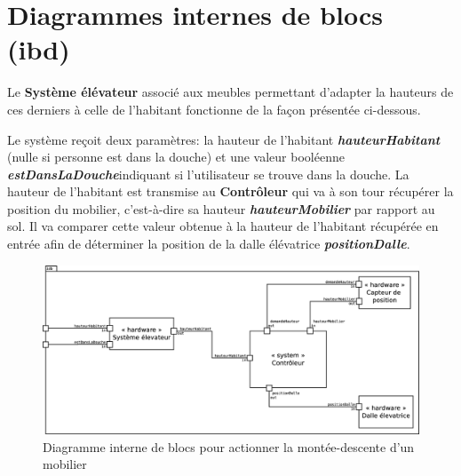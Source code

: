 \chapter{Diagrammes internes de blocs (ibd)}
Le \textbf{Système élévateur} associé aux meubles permettant d'adapter la hauteurs de ces derniers à celle de l'habitant fonctionne de la façon présentée ci-dessous.

Le système reçoit deux paramètres: la hauteur de l'habitant \textbf{\textit{hauteurHabitant}} (nulle si personne est dans la douche) et une valeur booléenne \textbf{\textit{estDansLaDouche}}indiquant si l'utilisateur se trouve dans la douche. 
La hauteur de l'habitant est transmise au \textbf{Contrôleur} qui va à son tour récupérer la position du mobilier, c'est-à-dire sa hauteur \textbf{\textit{hauteurMobilier}} par rapport au sol. Il va comparer cette valeur obtenue à la hauteur de l'habitant récupérée en entrée afin de déterminer la position de la dalle élévatrice \textbf{\textit{positionDalle}}. 
\begin{figure}[H]
	\centering
	\includegraphics[width=1\linewidth]{diagrams/bathroom/diagramme_blocks_ibd.eps}
	\caption{Diagramme interne de blocs pour actionner la montée-descente d'un mobilier}
	\label{fig:diagramme_ibd}
\end{figure}
